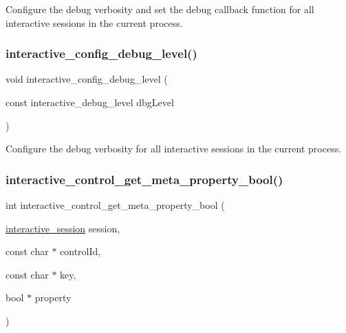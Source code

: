 Configure the debug verbosity and set the debug callback function for all interactive sessions in the current process. 

\mbox{\label{group___interactivity_gad0f225a797f196ed37fea7971314dde7}} 
\subsubsection{\texorpdfstring{interactive\+\_\+config\+\_\+debug\+\_\+level()}{interactive\_config\_debug\_level()}}
{\footnotesize\ttfamily void interactive\+\_\+config\+\_\+debug\+\_\+level (\begin{DoxyParamCaption}\item[{const interactive\+\_\+debug\+\_\+level}]{dbg\+Level }\end{DoxyParamCaption})}



Configure the debug verbosity for all interactive sessions in the current process. 

\mbox{\label{group___interactivity_ga42e0b33e56ea2cc4710ec4efb2b57175}} 
\subsubsection{\texorpdfstring{interactive\+\_\+control\+\_\+get\+\_\+meta\+\_\+property\+\_\+bool()}{interactive\_control\_get\_meta\_property\_bool()}}
{\footnotesize\ttfamily int interactive\+\_\+control\+\_\+get\+\_\+meta\+\_\+property\+\_\+bool (\begin{DoxyParamCaption}\item[{\mbox{\hyperlink{group___interactivity_ga6d8819d38b8dc8994a2299cf22a65a31}{interactive\+\_\+session}}}]{session,  }\item[{const char $\ast$}]{control\+Id,  }\item[{const char $\ast$}]{key,  }\item[{bool $\ast$}]{property }\end{DoxyParamCaption})}



